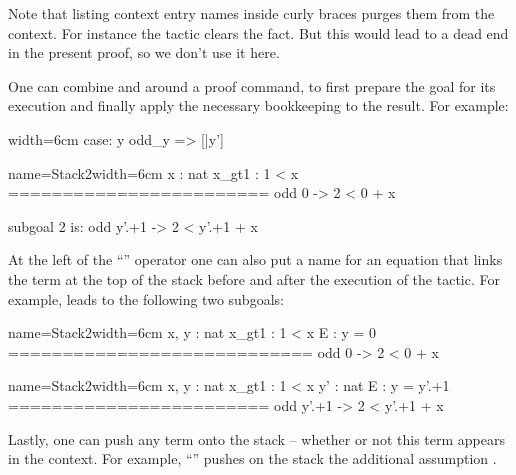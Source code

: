 Note that listing context entry names inside curly braces purges them
from the context. For instance the tactic 
clears the  fact. But this would lead to a dead end in the
present proof, so we don't use it here.


One can combine \C{:} and \C{=>} around a proof command, to first prepare the
goal for its execution and finally apply the necessary bookkeeping to the
result.  For example:

\begin{coq-left}{}{width=6cm}
case: y odd_y => [|y']
$~$
$~$
$~$
$~$
$~$
$~$
\end{coq-left}
\begin{coqout-right}{name=Stack2}{width=6cm}
  x : nat
  x_gt1 : 1 < x
  ========================
   odd 0 -> 2 < 0 + x

subgoal 2 is:
 odd y'.+1 -> 2 < y'.+1 + x
\end{coqout-right}

At the left of the ``\C{:}'' operator one can also put a name for an
equation that links the term at the top of the stack before and
after the execution of the tactic. For example,
  leads to
the following two subgoals:

\begin{coqout}{name=Stack2}{width=6cm}
 x, y : nat
 x_gt1 : 1 < x
 E : y = 0
============================
 odd 0 -> 2 < 0 + x
\end{coqout}
\begin{coqout}{name=Stack2}{width=6cm}
 x, y : nat
 x_gt1 : 1 < x
 y' : nat
 E : y = y'.+1
========================
 odd y'.+1 -> 2 < y'.+1 + x
\end{coqout}

Lastly, one can push any term onto the stack -- whether or not this
term appears in the context. For example,
``'' pushes on the stack
the additional assumption .


